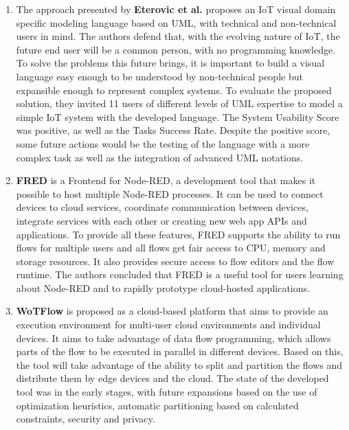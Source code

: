 \begin{enumerate}
    \item The approach presented by \textbf{Eterovic et al.} \cite{vpl_uml} proposes an IoT visual domain specific modeling language based on UML, with technical and non-technical users in mind. The authors defend that, with the evolving nature of IoT, the future end user will be a common person, with no programming knowledge. To solve the problems this future brings, it is important to build a visual language easy enough to be understood by non-technical people but expansible enough to represent complex systems. To evaluate the proposed solution, they invited 11 users of different levels of UML expertise to model a simple IoT system with the developed language. The System Usability Score was positive, as well as the Tasks Success Rate. Despite the positive score, some future actions would be the testing of the language with a more complex task as well as the integration of advanced UML notations.
    \item \textbf{FRED} \cite{fred} is a Frontend for Node-RED, a development tool that makes it possible to host multiple Node-RED processes. It can be used to connect devices to cloud services, coordinate communication between devices, integrate services with each other or creating new web app APIs and applications. To provide all these features, FRED supports the ability to run flows for multiple users and all flows get fair access to CPU, memory and storage resources. It also provides secure access to flow editors and the flow runtime. The authors concluded that FRED is a useful tool for users learning about Node-RED and to rapidly prototype cloud-hosted applications.
    \item \textbf{WoTFlow} \cite{wotflow_dnr} is proposed as a cloud-based platform that aims to provide an execution environment for multi-user cloud environments and individual devices. It aims to take advantage of data flow programming, which allows parts of the flow to be executed in parallel in different devices. Based on this, the tool will take advantage of the ability to split and partition the flows and distribute them by edge devices and the cloud. The state of the developed tool was in the early stages, with future expansions based on the use of optimization heuristics, automatic partitioning based on calculated constraints, security and privacy.

\end{enumerate}
